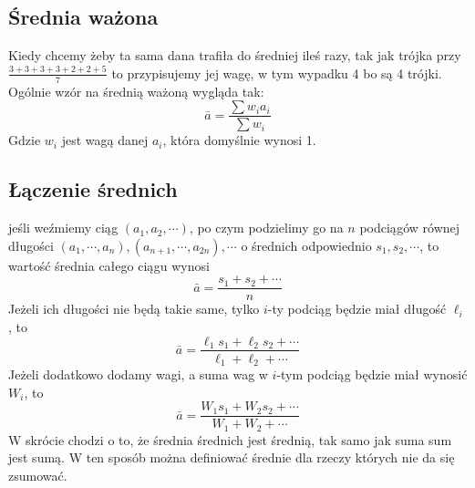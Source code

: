 \documentclass{article}
\begin{document}
\subsection{Średnia ważona}
Kiedy chcemy żeby ta sama dana trafiła do średniej ileś razy, tak jak trójka przy $\frac{3+3+3+3+2+2+5}{7}$ to przypisujemy jej wagę, w tym wypadku 4 bo są 4 trójki.
Ogólnie wzór na średnią ważoną wygląda tak:
\[\bar a = \frac{\sum w_ia_i}{\sum w_i}\]
Gdzie $w_i$ jest wagą danej $a_i$, która domyślnie wynosi 1.
\subsection{Łączenie średnich}
jeśli weźmiemy ciąg $(a_1, a_2, \cdots)$, po czym podzielimy go na $n$ podciągów równej długości $(a_1, \cdots, a_n), (a_{n+1}, \cdots, a_{2n}), \cdots$
o średnich odpowiednio $s_1, s_2, \cdots$, to wartość średnia całego ciągu wynosi\[
	\bar a =\frac{s_1+s_2+\cdots}{n}
\]
Jeżeli ich długości nie będą takie same, tylko $i$-ty podciąg będzie miał długość $\ell_i$, to\[
	\bar a =\frac{\ell_1s_1+\ell_2s_2+\cdots}{\ell_1+\ell_2+\cdots}
\]
Jeżeli dodatkowo dodamy wagi, a suma wag w $i$-tym podciąg będzie miał wynosić $W_i$, to\[
	\bar a =\frac{W_1s_1+W_2s_2+\cdots}{W_1+W_2+\cdots}
\]
W skrócie chodzi o to, że średnia średnich jest średnią, tak samo jak suma sum jest sumą. W ten sposób można definiować średnie dla rzeczy których nie da się zsumować.
\end{document}
